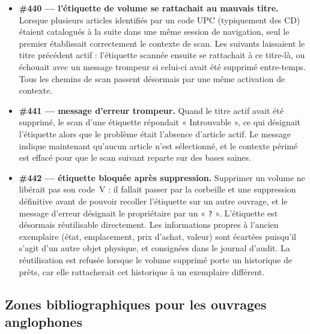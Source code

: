 \begin{itemize}
  \item \textbf{\#440 \string— l'étiquette de volume se rattachait au
        mauvais titre.} Lorsque plusieurs articles identifiés par un
        code UPC (typiquement des CD) étaient catalogués à la suite
        dans une même session de navigation, seul le premier
        établissait correctement le contexte de scan. Les suivants
        laissaient le titre précédent actif : l'étiquette scannée
        ensuite se rattachait à ce titre-là, ou échouait avec un
        message trompeur si celui-ci avait été supprimé entre-temps.
        Tous les chemins de scan passent désormais par une même
        activation de contexte.
  \item \textbf{\#441 \string— message d'erreur trompeur.} Quand le
        titre actif avait été supprimé, le scan d'une étiquette
        répondait « Introuvable », ce qui désignait l'étiquette alors
        que le problème était l'absence d'article actif. Le message
        indique maintenant qu'aucun article n'est sélectionné, et le
        contexte périmé est effacé pour que le scan suivant reparte
        sur des bases saines.
  \item \textbf{\#442 \string— étiquette bloquée après suppression.}
        Supprimer un volume ne libérait pas son code~V : il fallait
        passer par la corbeille et une suppression définitive avant de
        pouvoir recoller l'étiquette sur un autre ouvrage, et le
        message d'erreur désignait le propriétaire par un
        « \texttt{?} ». L'étiquette est désormais réutilisable
        directement. Les informations propres à l'ancien exemplaire
        (état, emplacement, prix d'achat, valeur) sont écartées
        puisqu'il s'agit d'un autre objet physique, et consignées
        dans le journal d'audit. La réutilisation est refusée lorsque
        le volume supprimé porte un historique de prêts, car elle
        rattacherait cet historique à un exemplaire différent.
\end{itemize}

\subsection*{Zones bibliographiques pour les ouvrages anglophones}

